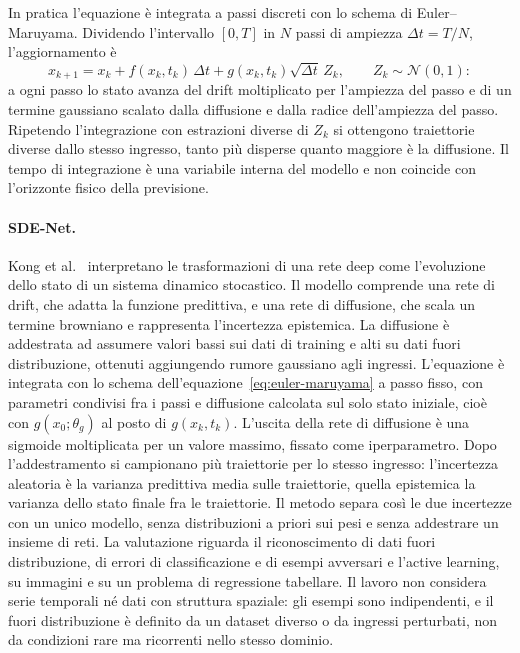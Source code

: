 In pratica l'equazione è integrata a passi discreti con lo schema di Euler--Maruyama. Dividendo l'intervallo $[0,T]$ in $N$ passi di ampiezza $\Delta t=T/N$, l'aggiornamento è
\begin{equation}
    x_{k+1}=x_k+f(x_k,t_k)\,\Delta t+g(x_k,t_k)\sqrt{\Delta t}\,Z_k,
    \qquad Z_k\sim\mathcal{N}(0,1):
    \label{eq:euler-maruyama}
\end{equation}
a ogni passo lo stato avanza del drift moltiplicato per l'ampiezza del passo e di un termine gaussiano scalato dalla diffusione e dalla radice dell'ampiezza del passo. Ripetendo l'integrazione con estrazioni diverse di $Z_k$ si ottengono traiettorie diverse dallo stesso ingresso, tanto più disperse quanto maggiore è la diffusione. Il tempo di integrazione è una variabile interna del modello e non coincide con l'orizzonte fisico della previsione.

\paragraph{SDE-Net.}
Kong et al.~\cite{kong2020sdenet} interpretano le trasformazioni di una rete deep come l'evoluzione dello stato di un sistema dinamico stocastico. Il modello comprende una rete di drift, che adatta la funzione predittiva, e una rete di diffusione, che scala un termine browniano e rappresenta l'incertezza epistemica. La diffusione è addestrata ad assumere valori bassi sui dati di training e alti su dati fuori distribuzione, ottenuti aggiungendo rumore gaussiano agli ingressi. L'equazione è integrata con lo schema dell'equazione~\eqref{eq:euler-maruyama} a passo fisso, con parametri condivisi fra i passi e diffusione calcolata sul solo stato iniziale, cioè con $g(x_0;\theta_g)$ al posto di $g(x_k,t_k)$. L'uscita della rete di diffusione è una sigmoide moltiplicata per un valore massimo, fissato come iperparametro. Dopo l'addestramento si campionano più traiettorie per lo stesso ingresso: l'incertezza aleatoria è la varianza predittiva media sulle traiettorie, quella epistemica la varianza dello stato finale fra le traiettorie. Il metodo separa così le due incertezze con un unico modello, senza distribuzioni a priori sui pesi e senza addestrare un insieme di reti. La valutazione riguarda il riconoscimento di dati fuori distribuzione, di errori di classificazione e di esempi avversari e l'active learning, su immagini e su un problema di regressione tabellare. Il lavoro non considera serie temporali né dati con struttura spaziale: gli esempi sono indipendenti, e il fuori distribuzione è definito da un dataset diverso o da ingressi perturbati, non da condizioni rare ma ricorrenti nello stesso dominio.

